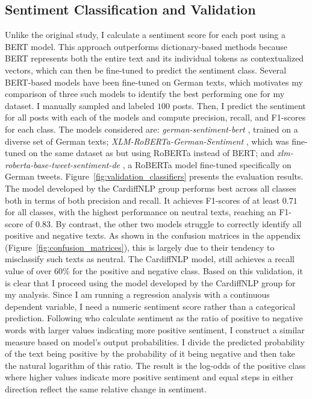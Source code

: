 \documentclass{article}
\begin{document}
\subsection{Sentiment Classification and Validation}
Unlike the original study, I calculate a sentiment score for each post using a BERT model. This approach outperforms dictionary-based methods because BERT represents both the entire text and its individual tokens as contextualized vectors, which can then be fine-tuned to predict the sentiment class. Several BERT-based models have been fine-tuned on German texts, which motivates my comparison of three such models to identify the best performing one for my dataset. I manually sampled and labeled $100$ posts. Then, I predict the sentiment for all posts with each of the models and compute precision, recall, and F1-scores for each class. The models considered are: \textit{german-sentiment-bert} \parencite{guhr_training_2020}, trained on a diverse set of German texts; \textit{XLM-RoBERTa-German-Sentiment} \parencite{nasser_ssaryxlm-roberta-german-sentiment_2024}, which was fine-tuned on the same dataset as \parencite{guhr_training_2020} but using RoBERTa instead of BERT; and \textit{xlm-roberta-base-tweet-sentiment-de} \parencite{cardiffnlp_cardiffnlpxlm-roberta-base-tweet-sentiment-_2023}, a RoBERTa model fine-tuned specifically on German tweets. Figure~\ref{fig:validation_classifiers} presents the evaluation results. The model developed by the CardiffNLP group performs best across all classes both in terms of both precision and recall. It achieves F1-scores of at least $0.71$ for all classes, with the highest performance on neutral texts, reaching an F1-score of $0.83$. By contrast, the other two models struggle to correctly identify all positive and negative texts. As shown in the confusion matrices in the appendix (Figure~\ref{fig:confusion_matrices}), this is largely due to their tendency to misclassify such texts as neutral. The CardiffNLP model, still achieves a recall value of over $60\%$ for the positive and negative class. Based on this validation, it is clear that I proceed using the model developed by the CardiffNLP group for my analysis.
\noindent Since I am running a regression analysis with a continuous dependent variable, I need a numeric sentiment score rather than a categorical prediction. Following \textcite{castanho_silva_modulation_2024} who calculate sentiment as the ratio of positive to negative words with larger values indicating more positive sentiment, I construct a similar measure based on model's output probabilities. I divide the predicted probability of the text being positive by the probability of it being negative and then take the natural logarithm of this ratio. The result is the log-odds of the positive class where higher values indicate more positive sentiment and equal steps in either direction reflect the same relative change in sentiment. \\
\end{document}
